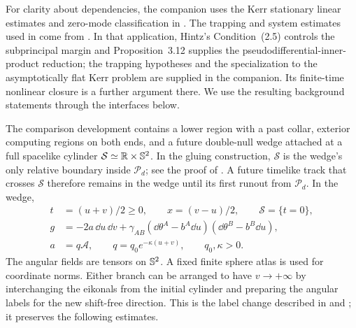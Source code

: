 For clarity about dependencies, the companion uses the Kerr stationary
linear estimates and zero-mode classification in
\cite[Theorems~5.1, 5.2, 6.6, Proposition~6.8, and Lemma~6.9]{HHV2025}.
The trapping and system estimates used in
\cite[, ]{KerrCTwo} come from
\cite{Dyatlov2016,Hintz2017}. In that application, Hintz's
Condition~(2.5) controls the subprincipal margin and
Proposition~3.12 supplies the pseudodifferential-inner-product
reduction; the trapping hypotheses and the specialization to the
asymptotically flat Kerr problem are supplied in the companion.
Its finite-time nonlinear closure is a further argument there.
We use the resulting background statements through the interfaces below.

The comparison development contains a lower region with a past
collar, exterior computing regions on both ends, and a future
double-null wedge attached at a full spacelike cylinder
$\mathcal S\simeq\mathbb R\times\mathbb S^2$. In the gluing construction,
$\mathcal S$ is the wedge's only relative boundary inside
$\mathcal P_d$; see the proof of
\cite[]{KerrCTwo}.
A future timelike track that crosses $\mathcal S$ therefore remains
in the wedge until its first runout from $\mathcal P_d$. In the wedge,
\begin{equation}\label{bg:metric}
\begin{split}
 t&=(u+v)/2\ge0,\qquad x=(v-u)/2,\qquad \mathcal S=\{t=0\},\\
 g&=-2a\,\dd u\,\dd v+
 \gamma_{AB}(\dd\theta^A-b^A\dd u)(\dd\theta^B-b^B\dd u),\\
 a&=q\mathcal A,\qquad q=q_0e^{-\kappa(u+v)},\qquad q_0,\kappa>0.
\end{split}
\end{equation}
The angular fields are tensors on $\mathbb S^2$. A fixed finite sphere
atlas is used for coordinate norms. Either branch can be arranged
to have $v\to+\infty$ by interchanging the eikonals from the
initial cylinder and preparing the angular labels for the new
shift-free direction. This is the label change described in
\cite[]{KerrCOne} and
\cite[]{KerrCTwo}; it preserves the
following estimates.

